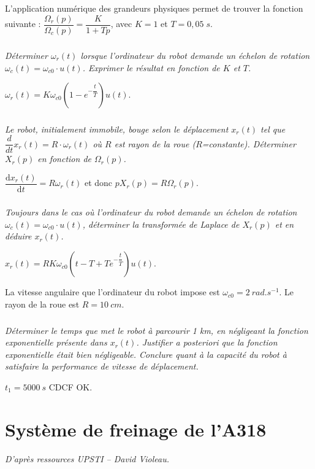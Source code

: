 \documentclass[10pt,fleqn]{article} %
\begin{document}
\begin{multicols}{2}
\ifprof
\else
L'application numérique des grandeurs physiques permet de trouver la fonction suivante : 
$\dfrac{\Omega_r(p)}{\Omega_c(p)}=\dfrac{K}{1+Tp}$, avec $K=1$ et $T=0,05\;s$.
\fi


\subparagraph{}
\textit{Déterminer $\omega_r (t)$ lorsque l’ordinateur du robot demande un échelon de rotation $\omega_c (t) = \omega_{c0} \cdot u(t)$. Exprimer le résultat en fonction de $K$ et $T$.}
\ifprof
\begin{corrige}
$\omega_r(t)=K\omega_{c0}\left(1-e^{-\dfrac{t}{T}}\right)u(t)$.
\end{corrige}
\else
\fi



\subparagraph{}
\textit{Le robot, initialement immobile, bouge selon le déplacement $x_r (t)$ tel que $\dfrac{d}{dt} x_r (t) = R\cdot \omega_r (t)$ où $R$ est rayon de la roue ($R$=constante). Déterminer $X_r (p)$ en fonction de $\Omega_r (p)$.}
\ifprof
\begin{corrige}
$\dfrac{\text{d}x_r(t)}{\text{d} t}=R\omega_r(t)$ et donc $pX_r(p)=R\Omega_r(p)$.
\end{corrige}
\else
\fi

\subparagraph{}
\textit{Toujours dans le cas où l'ordinateur du robot demande un échelon de rotation $\omega_c (t) = \omega_{c0}\cdot u(t)$, déterminer la transformée de Laplace de $X_r (p)$ et en déduire $x_r (t)$.} 
\ifprof
\begin{corrige}
$x_r(t)=RK\omega_{c0}\left( t-T+Te^{-\dfrac{t}{T}}\right)u(t)$.
\end{corrige}
\else
\fi

La vitesse angulaire que l'ordinateur du robot impose est $\omega_{c0}=\SI{2}{rad.s^{-1}}$. Le rayon de la roue est $R=\SI{10}{cm}$.  

\subparagraph{}
\textit{Déterminer le temps que met le robot à parcourir 1 km, en négligeant la fonction exponentielle présente dans $x_r (t)$. Justifier a posteriori que la fonction exponentielle était bien négligeable. Conclure quant à la capacité du robot à satisfaire la performance de vitesse de déplacement.}
\ifprof
\begin{corrige}
$t_1=\SI{5000}{s}$ CDCF OK. 
\end{corrige}
\else
\fi






\section*{Système de freinage de l'A318}
\setcounter{exo}{0}
\begin{flushright}
\textit{D'après ressources UPSTI -- David Violeau.}
\end{flushright}%



\end{multicols}
\end{document}
